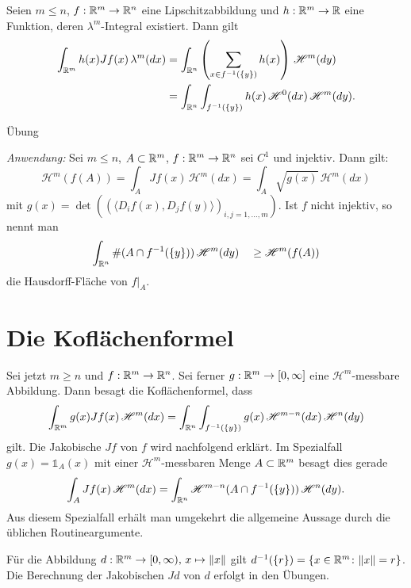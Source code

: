 \documentclass[a4paper,twoside,DIV15,BCOR12mm]{scrbook}
\newcommand{\ind}{\mathds 1}
\newcommand{\HM}{\mathscr H}
\begin{document}
\begin{korollar}
Seien $m\le n$, $f:\mathbb{R}^m\to\mathbb{R}^n$ eine Lipschitzabbildung und $h:\mathbb{R}^m\to\mathbb{R}$ eine Funktion, 
deren $\lambda^m$-Integral existiert. Dann gilt
\begin{align*}
\int_{\MdR^m}h(x)Jf(x)\, \lambda^m(dx)&=\int_{\MdR^n}\left(\sum_{x\in f^{-1}(\{y\})}h(x)\right)
\, \HM^m(dy)\\
&=\int_{\MdR^n}\int_{f^{-1}(\{y\})}h(x)\,\HM^0(dx)\, \HM^m(dy).
\end{align*}
\end{korollar}

\begin{beweis}
Übung
\end{beweis}


\emph{Anwendung:}
Sei \(m \leq n\), \(A \subset \mathbb{R}^m\), \(f: \mathbb{R}^m \to \mathbb{R}^n\) sei \(C^1\) und injektiv. Dann gilt:
\[
\HM^m(f(A)) = \int_A Jf(x) \,\HM^m(dx) = \int_A \sqrt{g(x)}\, \HM^m(dx)
\]
mit \(g(x) = \det( (\langle D_i f(x), D_j f(y) \rangle)_{i,j=1,\dots,m} )\).
Ist \(f\) nicht injektiv, so nennt man
\[
\int_{\MdR^n} \#(A \cap f^{-1}(\{y\}))\, \HM^m(dy) \quad \geq \HM^m(f(A))
\]
die Hausdorff-Fläche von  $f|_A$.


\section{Die Koflächenformel}

Sei jetzt \(m \geq n\) und \(f: \mathbb{R}^m \to \mathbb{R}^n\). Sei ferner \(g: \mathbb{R}^m \to [0,\infty]\) eine $\HM^m$-messbare 
Abbildung. Dann besagt die Koflächenformel, dass
\[
\int_{\MdR^m} g(x) Jf(x) \,\HM^m(dx) = \int_{\MdR^n} \int_{f^{-1}(\{y\})} g(x)\, \HM^{m-n}(dx) \,\HM^n(dy)
\]
gilt. Die Jakobische $Jf$ von $f$ wird nachfolgend erklärt. Im Spezialfall \(g(x) = \ind_A(x)\) mit einer $\HM^m$-messbaren Menge \(A \subset \mathbb{R}^m\) besagt dies gerade
\[
\int_A Jf(x) \,\HM^m(dx) = \int_{\MdR^n} \HM^{m-n}(A \cap f^{-1}(\{y\})) \,\HM^n(dy).
\]
Aus diesem Spezialfall erhält man umgekehrt die allgemeine Aussage durch die üblichen Routineargumente.
\begin{beispiel}
Für die Abbildung 
\(d: \mathbb{R}^m \to [0,\infty),\, x \mapsto \|x\|\) gilt \( d^{-1}(\{r\}) = \{x\in\mathbb{R}^m \colon \|x\|=r\}\). 
Die Berechnung der Jakobischen $Jd$ von $d$ erfolgt in den Übungen.
\end{beispiel}
\end{document}
